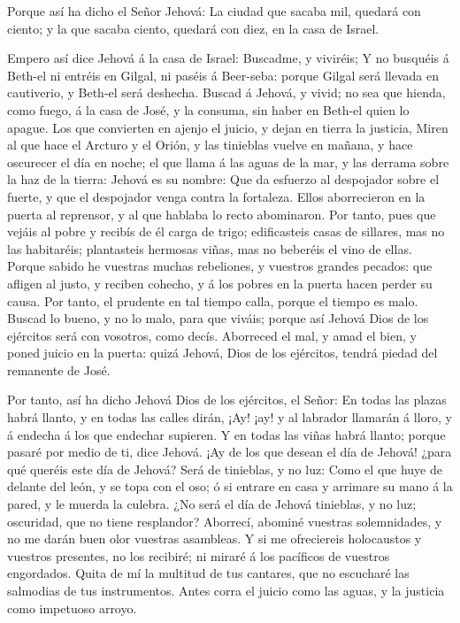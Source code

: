  Porque así ha dicho el Señor Jehová: La ciudad que sacaba
mil, quedará con ciento; y la que sacaba ciento, quedará con diez, en la
casa de Israel.

 Empero así dice Jehová á la casa de Israel: Buscadme, y
viviréis;  Y no busquéis á Beth-el ni entréis en Gilgal, ni
paséis á Beer-seba: porque Gilgal será llevada en cautiverio, y Beth-el
será deshecha.  Buscad á Jehová, y vivid; no sea que hienda,
como fuego, á la casa de José, y la consuma, sin haber en Beth-el quien
lo apague.  Los que convierten en ajenjo el juicio, y dejan
en tierra la justicia,  Miren al que hace el Arcturo y el
Orión, y las tinieblas vuelve en mañana, y hace oscurecer el día en
noche; el que llama á las aguas de la mar, y las derrama sobre la haz de
la tierra: Jehová es su nombre:  Que da esfuerzo al
despojador sobre el fuerte, y que el despojador venga contra la
fortaleza.  Ellos aborrecieron en la puerta al reprensor, y
al que hablaba lo recto abominaron.  Por tanto, pues que
vejáis al pobre y recibís de él carga de trigo; edificasteis casas de
sillares, mas no las habitaréis; plantasteis hermosas viñas, mas no
beberéis el vino de ellas.  Porque sabido he vuestras
muchas rebeliones, y vuestros grandes pecados: que afligen al justo, y
reciben cohecho, y á los pobres en la puerta hacen perder su causa.
 Por tanto, el prudente en tal tiempo calla, porque el
tiempo es malo.  Buscad lo bueno, y no lo malo, para que
viváis; porque así Jehová Dios de los ejércitos será con vosotros, como
decís.  Aborreced el mal, y amad el bien, y poned juicio en
la puerta: quizá Jehová, Dios de los ejércitos, tendrá piedad del
remanente de José.

 Por tanto, así ha dicho Jehová Dios de los ejércitos, el
Señor: En todas las plazas habrá llanto, y en todas las calles dirán,
¡Ay! ¡ay! y al labrador llamarán á lloro, y á endecha á los que endechar
supieren.  Y en todas las viñas habrá llanto; porque pasaré
por medio de ti, dice Jehová.  ¡Ay de los que desean el día
de Jehová! ¿para qué queréis este día de Jehová? Será de tinieblas, y no
luz:  Como el que huye de delante del león, y se topa con
el oso; ó si entrare en casa y arrimare su mano á la pared, y le muerda
la culebra.  ¿No será el día de Jehová tinieblas, y no luz;
oscuridad, que no tiene resplandor?  Aborrecí, abominé
vuestras solemnidades, y no me darán buen olor vuestras asambleas.
 Y si me ofreciereis holocaustos y vuestros presentes, no
los recibiré; ni miraré á los pacíficos de vuestros engordados.
 Quita de mí la multitud de tus cantares, que no escucharé
las salmodias de tus instrumentos.  Antes corra el juicio
como las aguas, y la justicia como impetuoso arroyo.

